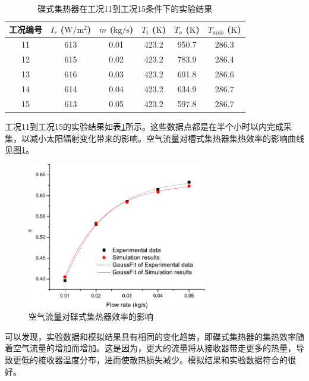 \begin{table}[htbp]\footnotesize
\setlength{\abovecaptionskip}{-10pt}
	\caption{碟式集热器在工况11到工况15条件下的实验结果}
	\begin{center}
	\begin{tabular}{cccccc}
		\toprule
		工况编号	& $I_r$ ($\mathrm{W/m^2}$)	&	$\dot{m}$ ($\mathrm{kg/s}$)			&	$T_i$ ($\mathrm{K}$)	&	$T_o$ ($\mathrm{K}$)		&	$T_{amb}$ ($\mathrm{K}$)\\
		\midrule
		11	&	613	&	0.01	&	423.2	&	950.7	&	286.3\\
		12	&	615	&	0.02	&	423.2	&	783.9	&	286.4\\
		13	&	616	&	0.03	&	423.2	&	691.8	&	286.6	\\
		14	&	614	&	0.04	&	423.2	&	634.9	&	286.7\\
		15	&	613	&	0.05	&	423.2	&	597.8	&	286.7\\
		\bottomrule
	\end{tabular}
	\end{center}
	\label{tab:ResultOfDish2}
\end{table}
工况11到工况15的实验结果如表\ref{tab:ResultOfDish2}所示。这些数据点都是在半个小时以内完成采集，以减小太阳辐射变化带来的影响。空气流量对槽式集热器集热效率的影响曲线见图\ref{fig:q_m-eta-dish}。

\begin{figure}[!ht]
\centering
\includegraphics[width=0.7\textwidth]{fig/q_m-eta-dish}
\caption{空气流量对碟式集热器效率的影响}
\label{fig:q_m-eta-dish}
\end{figure}

可以发现，实验数据和模拟结果具有相同的变化趋势，即碟式集热器的集热效率随着空气流量的增加而增加。这是因为，更大的流量将从接收器带走更多的热量，导致更低的接收器温度分布，进而使散热损失减少。模拟结果和实验数据符合的很好。

